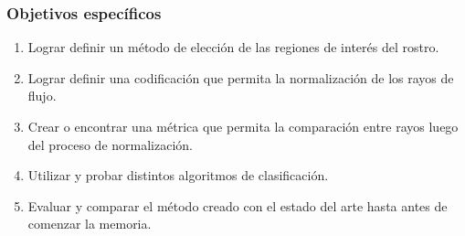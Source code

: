 \subsubsection{Objetivos específicos}
\label{subsubsec:objgeneral}
	\begin{enumerate}
		\item Lograr definir un método de elección de las regiones de interés del rostro.
		\item Lograr definir una codificación que permita la normalización de los rayos de flujo.
		\item Crear o encontrar una métrica que permita la comparación entre rayos luego del proceso de normalización.
		\item Utilizar y probar distintos algoritmos de clasificación.
		\item Evaluar y comparar el método creado con el estado del arte hasta antes de comenzar la memoria. 
	\end{enumerate}